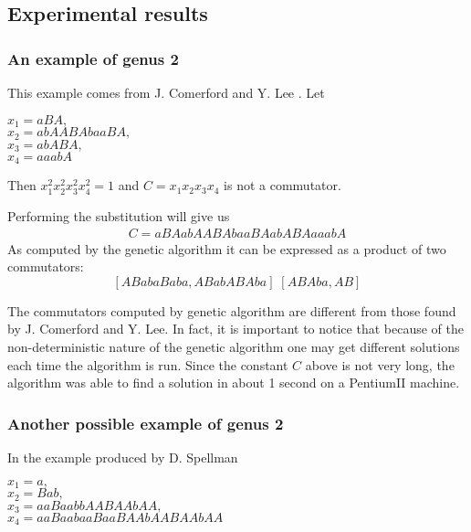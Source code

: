 \documentclass{article}
\begin{document}
\subsection{Experimental results}

\subsubsection{An example of genus 2}

This example comes from J. Comerford and Y. Lee \cite{C&L}. Let

\vspace{3mm}
\noindent
$x_1 = a B A,$ \\
$x_2 = a b A A B A b a a B A,$ \\
$x_3 = a b A B A,$ \\
$x_4 = a a a b A$
\vspace{3mm}

\noindent
Then $x_1^2 x_2^2 x_3^2 x_4^2 = 1$  
and $C = x_1 x_2 x_3 x_4$ is not a commutator.

\noindent
Performing the substitution will give us 
\begin{eqnarray*}
C = a B A a b A A B A b a a B A a b A B A a a a b A
\end{eqnarray*}
As computed by the genetic algorithm it can be expressed as a product
of two commutators:
\[
[ A B a b a B a b a, A B a b A B A b a ] \;  [ A B A b a, A B ]
\]

The commutators computed by genetic algorithm are different from those
found by J. Comerford and Y. Lee. In fact, it is important to notice
that because of the non-deterministic nature of the genetic algorithm
one may get different solutions each time the algorithm is run. Since
the constant $C$ above is not very long, the algorithm was able to
find a solution in about 1 second on a PentiumII machine.

\subsubsection{Another possible example of genus 2}

In the example produced by D. Spellman 

\vspace{3mm}
\noindent
$x_1 = a,$ \\
$x_2 = B a b,$ \\
$x_3 = a a B a a b b A A B A A b A A,$ \\
$x_4 = a a B a a b a a B a a B A A b A A B A A b A A$
\vspace{3mm}
\end{document}
